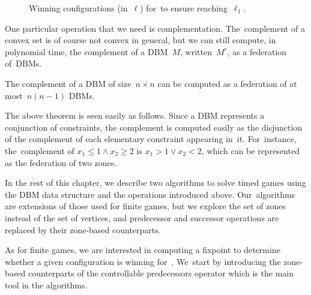 \begin{figure}[ht]
\begin{tikzpicture}[node distance=2.5cm,auto]
  \end{tikzpicture}
  \caption{Winning configurations (in~$\ell$)
    for~\Eve to ensure reaching~$\ell_1$.
  }
  \label{9-fig:non-convex}
\end{figure}

One particular operation that we need is complementation.
The~complement of a convex set is of course not convex in general, but
we can still compute, in polynomial time, the complement of a DBM~$M$,
written~$M^c$, as a federation of~DBMs.
\begin{theorem}
\label{9-thm:complement_DBM}
  The complement of a DBM of size~$n\times n$ can be computed as a
  federation of at most~$n(n-1)$ DBMs.
\end{theorem}
The above theorem is seen easily as follows. Since a DBM represents a
conjunction of constraints, the complement is computed easily as the
disjunction of the complement of each elementary constraint appearing
in~it.  For~instance, the~complement of $x_1\leq 1 \land x_2 \geq 2$ is
$x_1>1 \lor x_2<2$, which can be represented as the federation of two
zones.




In the rest of this chapter, we describe two algorithms to solve timed
games using the DBM data structure and the operations introduced
above. Our~algorithms are extensions of those used for finite games,
but we explore the set of zones instead of the set of vertices, and
predecessor and successor operations are replaced by their zone-based
counterparts.

As for finite games, we are interested in computing a fixpoint to
determine whether a given configuration is winning for~\Eve. We~start
by introducing the zone-based counterparts of the controllable predecessors operator
which
is the main tool in the algorithms.
